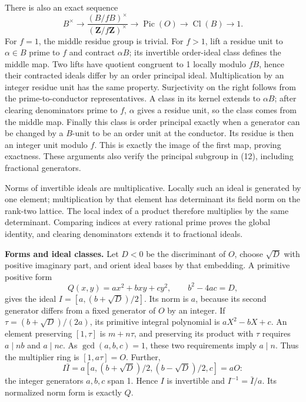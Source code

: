 \documentclass[11pt,a4paper]{article}
\begin{document}
There is also an exact sequence \[
B^\times\longrightarrow
\frac{(B/fB)^\times}{(\mathbf Z/f\mathbf Z)^\times}
\longrightarrow\operatorname{Pic}(O)
\longrightarrow\operatorname{Cl}(B)\longrightarrow1.
\] For \(f=1\), the middle residue group is trivial. For \(f>1\), lift a
residue unit to \(\alpha\in B\) prime to \(f\) and contract
\(\alpha B\); its invertible order-ideal class defines the middle map.
Two lifts have quotient congruent to 1 locally modulo \(fB\), hence
their contracted ideals differ by an order principal ideal.
Multiplication by an integer residue unit has the same property.
Surjectivity on the right follows from the prime-to-conductor
representatives. A class in its kernel extends to \(\alpha B\); after
clearing denominators prime to \(f\), \(\alpha\) gives a residue unit,
so the class comes from the middle map. Finally this class is order
principal exactly when a generator can be changed by a \(B\)-unit to be
an order unit at the conductor. Its residue is then an integer unit
modulo \(f\). This is exactly the image of the first map, proving
exactness. These arguments also verify the principal subgroup in (12),
including fractional generators.

Norms of invertible ideals are multiplicative. Locally such an ideal is
generated by one element; multiplication by that element has determinant
its field norm on the rank-two lattice. The local index of a product
therefore multiplies by the same determinant. Comparing indices at every
rational prime proves the global identity, and clearing denominators
extends it to fractional ideals.

\textbf{Forms and ideal classes.} Let \(D<0\) be the discriminant of
\(O\), choose \(\sqrt D\) with positive imaginary part, and orient ideal
bases by that embedding. A primitive positive form \[
Q(x,y)=ax^2+bxy+cy^2,\qquad b^2-4ac=D,
\] gives the ideal \(I=[a,(b+\sqrt D)/2]\). Its norm is \(a\), because
its second generator differs from a fixed generator of \(O\) by an
integer. If \(\tau=(b+\sqrt D)/(2a)\), its primitive integral polynomial
is \(aX^2-bX+c\). An element preserving \([1,\tau]\) is \(m+n\tau\), and
preserving its product with \(\tau\) requires \(a\mid nb\) and
\(a\mid nc\). As \(\gcd(a,b,c)=1\), these two requirements imply
\(a\mid n\). Thus the multiplier ring is \([1,a\tau]=O\). Further, \[
I\bar I=a[a,(b+\sqrt D)/2,(b-\sqrt D)/2,c]=aO:
\] the integer generators \(a,b,c\) span 1. Hence \(I\) is invertible
and \(I^{-1}=\bar I/a\). Its normalized norm form is exactly \(Q\).
\end{document}
